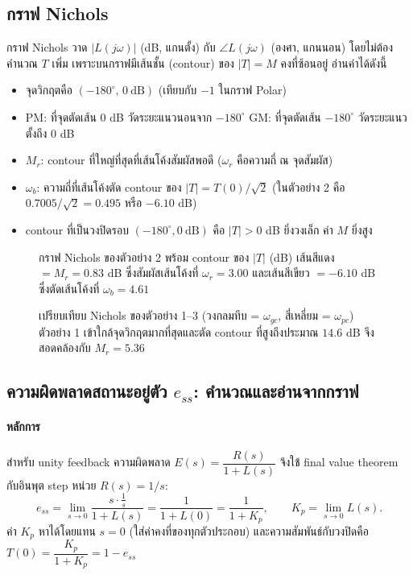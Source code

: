 \documentclass[12pt,a4paper]{article}
\newcommand{\jw}{j\omega}
\begin{document}
\subsection{กราฟ Nichols}
กราฟ Nichols วาด $|L(\jw)|$ (dB, แกนตั้ง) กับ $\angle L(\jw)$ (องศา, แกนนอน) โดยไม่ต้องคำนวณ $T$ เพิ่ม เพราะบนกราฟมีเส้นชั้น (contour) ของ $|T|=M$ คงที่ซ้อนอยู่ อ่านค่าได้ดังนี้
\begin{itemize}[leftmargin=1.2em,itemsep=2pt]
\item จุดวิกฤตคือ $(-180^\circ,\,0\ \mathrm{dB})$ (เทียบกับ $-1$ ในกราฟ Polar)
\item PM: ที่จุดตัดเส้น $0$ dB วัดระยะแนวนอนจาก $-180^\circ$ \; GM: ที่จุดตัดเส้น $-180^\circ$ วัดระยะแนวตั้งถึง $0$ dB
\item $M_r$: contour ที่ใหญ่ที่สุดที่เส้นโค้งสัมผัสพอดี ($\omega_r$ คือความถี่ ณ จุดสัมผัส)
\item $\omega_b$: ความถี่ที่เส้นโค้งตัด contour ของ $|T|=T(0)/\sqrt2$ (ในตัวอย่าง 2 คือ $0.7005/\sqrt2=0.495$ หรือ $-6.10$ dB)
\item contour ที่เป็นวงปิดรอบ $(-180^\circ,0\ \mathrm{dB})$ คือ $|T|>0$ dB ยิ่งวงเล็ก ค่า $M$ ยิ่งสูง
\end{itemize}

\begin{figure}[h]
\centering

\caption{กราฟ Nichols ของตัวอย่าง 2 พร้อม contour ของ $|T|$ (dB) เส้นสีแดง $=M_r=0.83$ dB ซึ่งสัมผัสเส้นโค้งที่ $\omega_r=3.00$ และเส้นสีเขียว $=-6.10$ dB ซึ่งตัดเส้นโค้งที่ $\omega_b=4.61$}
\end{figure}

\begin{figure}[h]
\centering

\caption{เปรียบเทียบ Nichols ของตัวอย่าง 1--3 (วงกลมทึบ = $\omega_{gc}$, สี่เหลี่ยม = $\omega_{pc}$) ตัวอย่าง 1 เข้าใกล้จุดวิกฤตมากที่สุดและตัด contour ที่สูงถึงประมาณ $14.6$ dB จึงสอดคล้องกับ $M_r=5.36$}
\end{figure}

\subsection{ความผิดพลาดสถานะอยู่ตัว $e_{ss}$: คำนวณและอ่านจากกราฟ}

\paragraph{หลักการ}
สำหรับ unity feedback ความผิดพลาด $E(s)=\dfrac{R(s)}{1+L(s)}$ จึงใช้ final value theorem กับอินพุต step หน่วย $R(s)=1/s$:
\[
e_{ss}=\lim_{s\to0}\frac{s\cdot\frac1s}{1+L(s)}=\frac{1}{1+L(0)}=\frac{1}{1+K_p},
\qquad K_p=\lim_{s\to0}L(s).
\]
ค่า $K_p$ หาได้โดยแทน $s=0$ (ใส่ค่าคงที่ของทุกตัวประกอบ) และความสัมพันธ์กับวงปิดคือ $T(0)=\dfrac{K_p}{1+K_p}=1-e_{ss}$
\end{document}
